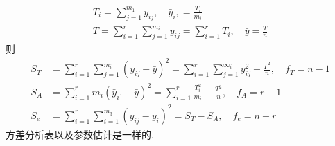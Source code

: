 \begin{itemize}
  \begin{gather*}
    T_{i}=\sum_{j=1}^{m_{1}} y_{i j}, \quad \bar{y}_{i},=\frac{T_{i}}{m_{i}} \\
    T=\sum_{i=1}^{r} \sum_{j=1}^{m_{i}} y_{i j}=\sum_{i=1}^{r} T_{i}, \quad \bar{y}=\frac{T}{n}
  \end{gather*}
  则
  \begin{equation}
    \label{eq:8.1.28}
    \begin{split}
      S_{T} & =\sum_{i=1}^{r} \sum_{j=1}^{m_{i}}\left(y_{i j}-\bar{y}\right)^{2}=\sum_{i=1}^{r} \sum_{j=1}^{\infty_{i}} y_{i j}^{2}-\frac{T^{2}}{n}, \quad f_{T}=n-1 \\
      S_{A} & =\sum_{i=1}^{r} m_{i}\left(\bar{y}_{i} .-\bar{y}\right)^{2}=\sum_{i=1}^{r} \frac{T_{i}^{2}}{m_{i}}-\frac{T^{2}}{n}, \quad f_{A}=r-1 \\
      S_{e} & =\sum_{i=1}^{r} \sum_{i=1}^{m_{3}}\left(y_{i j}-\bar{y}_{i}\right)^{2}=S_{T}-S_{A},\quad f_e = n - r
    \end{split}
  \end{equation}
  方差分析表以及参数估计是一样的.
\end{itemize}

